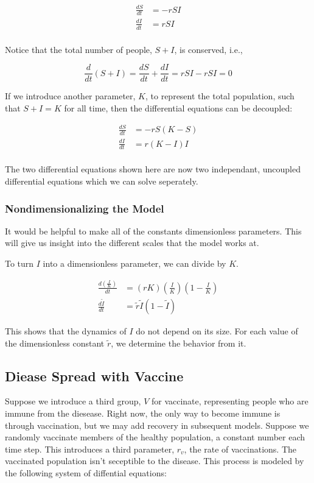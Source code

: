 \documentclass[titlepage]{article}
\begin{document}
\begin{align*}
\frac{dS}{dt} & = - r S I \\
\frac{dI}{dt} & = r S I \\
\end{align*}

Notice that the total number of people, $S + I$, is conserved, i.e.,

\[ \frac{d}{dt} \left( S + I \right) = \frac{dS}{dt} + \frac{dI}{dt}
	= r S I - r S I = 0 \]

If we introduce another parameter, $K$, to represent the total population,
	such that $S + I = K$ for all time, then the differential equations
	can be decoupled:

\begin{align*}
\frac{dS}{dt} & = - r S (K - S) \\
\frac{dI}{dt} & = r (K - I) I \\
\end{align*}

The two differential equations shown here are now two independant, uncoupled
	differential equations which we can solve seperately.

\subsubsection{Nondimensionalizing the Model}

It would be helpful to make all of the constants dimensionless parameters.
This will give us insight into the different scales that the model works at.

To turn $I$ into a dimensionless parameter, we can divide by $K$.

\begin{align*}
\frac{d\left(\frac{I}{K}\right)}{dt}
	& = \left( r K \right) \left( \frac{I}{K} \right) \left( 1 - \frac{I}{K} \right)\\
\frac{d\widetilde{I}}{dt}
	& = \widetilde{r} \widetilde{I} \left( 1 - \widetilde{I} \right)
\end{align*}

This shows that the dynamics of $I$ do not depend on its size.
For each value of the dimensionless constant $\widetilde{r}$,
	we determine the behavior from it.

\subsection{Diease Spread with Vaccine}

Suppose we introduce a third group, $V$ for vaccinate, representing people who are
	immune from the diesease.
Right now, the only way to become immune is through vaccination,
	but we may add recovery in subsequent models.
Suppose we randomly vaccinate members of the healthy population,
	a constant number each time step.
This introduces a third parameter, $r_v$, the rate of vaccinations.
The vaccinated population isn't seceptible to the disease.
This process is modeled by the following system of diffential equations:
\end{document}
